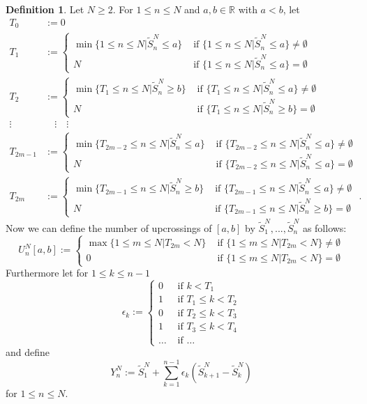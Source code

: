 \documentclass[phd]{UWMThesis}
\newcommand{\StN}[1]{\tilde{S}_{#1}^N}
\newcommand{\YN}[1]{Y_{#1}^N}
\newcommand{\UNab}[1]{U_{#1}^N[a,b]}
\newcommand{\mdot}{\textrm{ .}}
\renewcommand{\.}{\textrm{ .}}
\theoremstyle{definition}
\newtheorem{defn}[thm]{Definition}
\numberwithin{thm}{chapter}
\begin{document}
\begin{defn}
	Let $N\geq 2$. For $1\leq n\leq N$ and $a, b \in \mathbb{R}$ with $a < b$, let 
	\begin{align*}
	T_0 &:= 0\\
	T_1 &:= \begin{cases} 
	\min\{1\leq n\leq N | \StN{n}\leq a\} & \textrm{ if } \{1\leq n\leq N | \StN{n}\leq a\}\neq \emptyset\\
	N & \textrm{ if } \{1\leq n\leq N | \StN{n}\leq a\}= \emptyset
	\end{cases}\\	
	T_2 &:= \begin{cases} 
	\min\{T_1\leq n\leq N | \StN{n}\geq b\} & \textrm{ if } \{T_1\leq n\leq N | \StN{n}\leq a\}\neq \emptyset\\
	N & \textrm{ if } \{T_1\leq n\leq N | \StN{n}\geq b\} = \emptyset
	\end{cases}\\	
	\vdots &\quad \vdots \quad \vdots	\\
	T_{2m-1} &:= \begin{cases} 
	\min\{T_{2m-2}\leq n\leq N | \StN{n}\leq a\} & \textrm{ if } \{T_{2m-2}\leq n\leq N | \StN{n}\leq a\}\neq \emptyset\\
	N & \textrm{ if } \{T_{2m-2}\leq n\leq N | \StN{n}\leq a\}= \emptyset
	\end{cases}\\	
	T_{2m} &:= \begin{cases} 
	\min\{T_{2m-1}\leq n\leq N | \StN{n}\geq b\} & \textrm{ if } \{T_{2m-1}\leq n\leq N | \StN{n}\leq a\}\neq \emptyset\\
	N & \textrm{ if } \{T_{2m-1}\leq n\leq N | \StN{n}\geq b\} = \emptyset
	\end{cases}\mdot
	\end{align*}
	Now we can define the number of upcrossings of $[a, b]$ by $\StN{1}, ..., \StN{n}$ as follows:
	\[
	\UNab{n} :=\begin{cases}  
	\max\{1\leq m \leq N | T_{2m} < N\} & \textrm{ if } \{1\leq m \leq N | T_{2m} < N\}\neq \emptyset\\
	0 &  \textrm{ if } \{1\leq m \leq N | T_{2m} < N\} = \emptyset
	\end{cases}
	\]
	Furthermore let for $1\leq k\leq n-1$
	\[ \epsilon_k := \begin{cases} 
	0 & \textrm{ if } k < T_1 \\
	1 & \textrm{ if } T_1 \leq k < T_2\\
	0 & \textrm{ if } T_2 \leq k < T_3\\
	1 & \textrm{ if } T_3 \leq k < T_4\\
	\dots & \textrm{ if } \dots
	\end{cases}
	\]
	and define
	$$\YN{n} := \StN{1} + \sum\limits_{k=1}^{n-1} \epsilon_k (\StN{k+1}-\StN{k})$$
	for $1\leq n\leq N$. 	
\end{defn}
\end{document}
